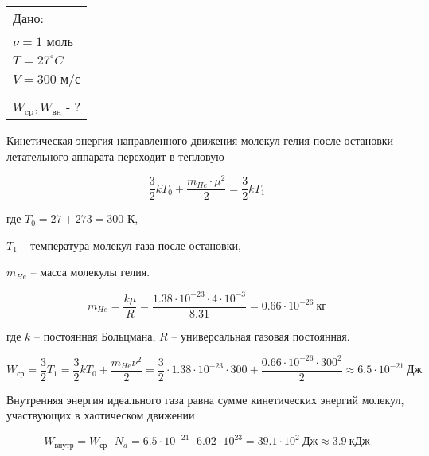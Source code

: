\solutionSection

\begin{tabular}{l|}
    Дано: \\
    $\nu = 1$ моль \\
    $T = 27^\circ C$ \\
    $V = 300$ м/с \\
    \hline \\
    $W_\text{cp}, W_\text{вн}$ - ?
\end{tabular}

Кинетическая энергия направленного движения молекул гелия 
после остановки летательного аппарата переходит в тепловую

$$\frac{3}{2}kT_0 + \frac{m_{He} \cdot \mu^2}{2} = \frac{3}{2} k T_1$$

где $T_0=27+273=300$ К,

$T_1$ – температура молекул газа после остановки,

$m_{He}$ – масса молекулы гелия.

$$m_{He} = \frac{k\mu}{R} = \frac{1.38 \cdot 10^{-23} \cdot 4 \cdot 10^{-3}}{8.31} = 0.66 \cdot 10^{-26} \: \text{кг}$$
 
где $k$ – постоянная Больцмана, $R$ – универсальная газовая постоянная.

$$W_{\text{ср}} =\frac{3}{2}T_1= \frac{3}{2} k T_0 +\frac{m_{He} \nu^2}{2} = \frac{3}{2} \cdot 1.38 \cdot 10^{-23} \cdot 300 + \frac{0.66 \cdot 10^{-26} \cdot 300^2}{2} \approx 6.5 \cdot 10^{-21} \: \text{Дж}$$
 
Внутренняя энергия идеального газа равна сумме кинетических энергий молекул, участвующих в хаотическом движении

$$W_\text{внутр} = W_\text{ср} \cdot N_a = 6.5 \cdot 10^{-21} \cdot 6.02 \cdot 10^{23} = 39.1 \cdot 10^2 \: \text{Дж} \approx 3.9 \: \text{кДж}$$


